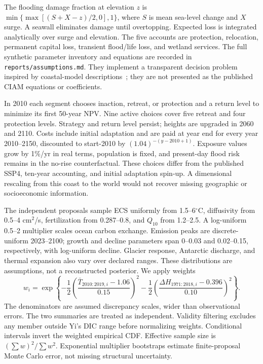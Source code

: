 \documentclass[11pt]{article}
\begin{document}
The flooding damage fraction at elevation $z$ is
$\min\{\max[(S+X-z)/2,0],1\}$, where $S$ is mean sea-level change and $X$
surge. A seawall eliminates damage until overtopping. Expected loss is
integrated analytically over surge and elevation. The five accounts are
protection, relocation, permanent capital loss, transient flood/life loss,
and wetland services. The full synthetic parameter inventory and equations
are recorded in \texttt{reports/assumptions.md}. They implement a transparent
decision problem inspired by coastal-model descriptions\ \cite{diam,ciam};
they are not presented as the published CIAM equations or coefficients.

In 2010 each segment chooses inaction, retreat, or protection and a return
level to minimize its first 50-year NPV. Nine active choices cover five
retreat and four protection levels. Strategy and return level persist;
heights are upgraded in 2060 and 2110. Costs include initial adaptation and
are paid at year end for every year 2010--2150, discounted to start-2010 by
$(1.04)^{-(y-2010+1)}$. Exposure values grow by 1\%/yr in real terms, population
is fixed, and present-day flood risk remains in the no-rise counterfactual.
These choices differ from the published SSP4, ten-year accounting, and
initial adaptation spin-up. A dimensional rescaling from this coast to the
world would not recover missing geographic or socioeconomic information.

The independent proposals sample ECS uniformly from 1.5--6$^\circ$C,
diffusivity from 0.5--4 cm$^2$/s, fertilization from 0.287--0.8, and $Q_{10}$
from 1.2--2.5. A log-uniform 0.5--2 multiplier scales ocean carbon exchange.
Emission peaks are discrete-uniform 2023--2100; growth and decline parameters
span 0--0.03 and 0.02--0.15, respectively, with log-uniform decline.
Glacier response, Antarctic discharge, and thermal expansion also vary over
declared ranges. These distributions are assumptions, not a reconstructed
posterior. We apply weights
\begin{equation}
w_i=\exp\left\{-\frac12\left(\frac{\bar T_{2010:2019,i}-1.06}{0.15}\right)^2
-\frac12\left(\frac{\Delta H_{1971:2018,i}-0.396}{0.10}\right)^2\right\}.
\end{equation}
The denominators are assumed discrepancy scales, wider than observational
errors. The two summaries are treated as independent. Validity filtering
excludes any member outside Yi's DIC range before normalizing weights.
Conditional intervals invert the weighted empirical CDF. Effective sample
size is $(\sum w)^2/\sum w^2$. Exponential multiplier bootstraps estimate
finite-proposal Monte Carlo error, not missing structural uncertainty.
\end{document}
